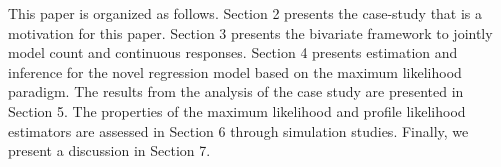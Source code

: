 \documentclass[useAMS,referee]{biom}
\begin{document}
This paper is organized as follows. Section 2 presents the case-study that is a motivation for this paper. Section 3 presents the bivariate framework to jointly model count and continuous responses. Section 4 presents estimation and inference for the novel regression model based on the maximum likelihood paradigm. The results from the analysis of the case study are presented in Section 5. The properties of the maximum likelihood and profile likelihood estimators are assessed in Section 6 through simulation studies. Finally, we present a discussion in Section 7.















\end{document}
